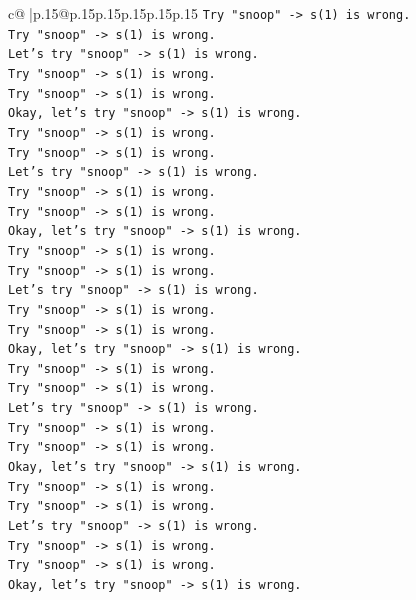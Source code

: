 \documentclass{article}
\begin{document}
{\begin{supertabular}{c@{$\;$}|p{.15\linewidth}@{}p{.15\linewidth}p{.15\linewidth}p{.15\linewidth}p{.15\linewidth}p{.15\linewidth}}
{{{\texttt{Try "snoop" {-}> s(1) is wrong.} \\
\texttt{Try "snoop" {-}> s(1) is wrong.} \\
\texttt{Let's try "snoop" {-}> s(1) is wrong.} \\
\texttt{Try "snoop" {-}> s(1) is wrong.} \\
\texttt{Try "snoop" {-}> s(1) is wrong.} \\
\texttt{Okay, let's try "snoop" {-}> s(1) is wrong.} \\
\texttt{Try "snoop" {-}> s(1) is wrong.} \\
\texttt{Try "snoop" {-}> s(1) is wrong.} \\
\texttt{Let's try "snoop" {-}> s(1) is wrong.} \\
\texttt{Try "snoop" {-}> s(1) is wrong.} \\
\texttt{Try "snoop" {-}> s(1) is wrong.} \\
\texttt{Okay, let's try "snoop" {-}> s(1) is wrong.} \\
\texttt{Try "snoop" {-}> s(1) is wrong.} \\
\texttt{Try "snoop" {-}> s(1) is wrong.} \\
\texttt{Let's try "snoop" {-}> s(1) is wrong.} \\
\texttt{Try "snoop" {-}> s(1) is wrong.} \\
\texttt{Try "snoop" {-}> s(1) is wrong.} \\
\texttt{Okay, let's try "snoop" {-}> s(1) is wrong.} \\
\texttt{Try "snoop" {-}> s(1) is wrong.} \\
\texttt{Try "snoop" {-}> s(1) is wrong.} \\
\texttt{Let's try "snoop" {-}> s(1) is wrong.} \\
\texttt{Try "snoop" {-}> s(1) is wrong.} \\
\texttt{Try "snoop" {-}> s(1) is wrong.} \\
\texttt{Okay, let's try "snoop" {-}> s(1) is wrong.} \\
\texttt{Try "snoop" {-}> s(1) is wrong.} \\
\texttt{Try "snoop" {-}> s(1) is wrong.} \\
\texttt{Let's try "snoop" {-}> s(1) is wrong.} \\
\texttt{Try "snoop" {-}> s(1) is wrong.} \\
\texttt{Try "snoop" {-}> s(1) is wrong.} \\
\texttt{Okay, let's try "snoop" {-}> s(1) is wrong.} \\
}}}
\end{supertabular}}
\end{document}
